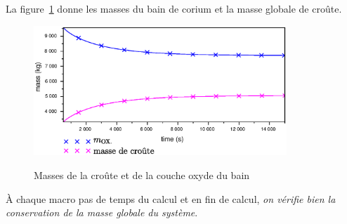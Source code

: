 La figure~\ref{fig:mass_balance} donne les masses du bain de corium et la masse globale de croûte.
\begin{figure}[H]
\centering
\includegraphics[width=0.85\textwidth, keepaspectratio=true]{Figures/mass_balance.eps}\\
\caption{Masses de la croûte et de la couche oxyde du bain}
\label{fig:mass_balance}
\end{figure}
À chaque macro pas de temps du calcul et en fin de calcul, \emph{on vérifie bien la conservation de la masse globale du système}.

